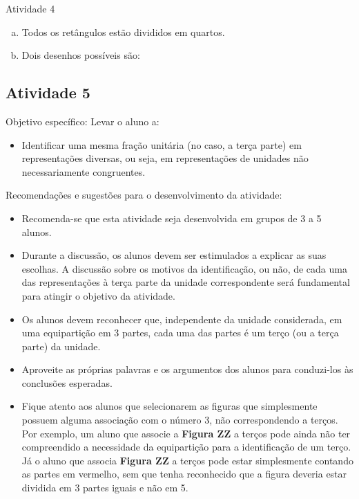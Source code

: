 \documentclass[oneside]{book}
\begin{document}
\begin{multicols}{2}
\begin{resposta*}{Atividade 4}
\begin{enumerate}[a),wide,labelindent=0pt] %
    \item       Todos os retângulos estão divididos em quartos.
    \item       Dois desenhos possíveis são:
\end{enumerate} %
\end{resposta*}




\subsection{Atividade 5}
  Objetivo específico: Levar o aluno a:

\begin{itemize} %
    \item       Identificar uma mesma fração unitária (no caso, a terça parte) em representações diversas, ou seja, em representações de unidades não necessariamente congruentes.
\end{itemize} %



  Recomendações e sugestões para o desenvolvimento da atividade:
\begin{itemize} %
    \item       Recomenda-se que esta atividade seja desenvolvida em grupos de 3 a 5 alunos.
    \item       Durante a discussão, os alunos devem ser estimulados a explicar as suas escolhas. A discussão sobre os motivos da identificação, ou não, de cada uma das representações à terça parte da unidade correspondente será fundamental para atingir o objetivo da atividade.
    \item       Os alunos devem reconhecer que, independente da unidade considerada, em uma equipartição em 3 partes, cada uma das partes é um terço (ou a terça parte) da unidade.
    \item       Aproveite as próprias palavras e os argumentos dos alunos para conduzi-los às conclusões esperadas.
    \item       Fique atento aos alunos que selecionarem as figuras que simplesmente possuem alguma associação com o número 3, não correspondendo a terços. Por exemplo, um aluno que associe a       {\bf Figura ZZ}       a terços pode ainda não ter compreendido a necessidade da equipartição para a identificação de um terço. Já o aluno que associa       {\bf Figura ZZ}       a terços pode estar simplesmente contando as partes em vermelho, sem que tenha reconhecido que a figura deveria estar dividida em 3 partes iguais e não em 5.
\end{itemize} %






\end{multicols}
\end{document}
